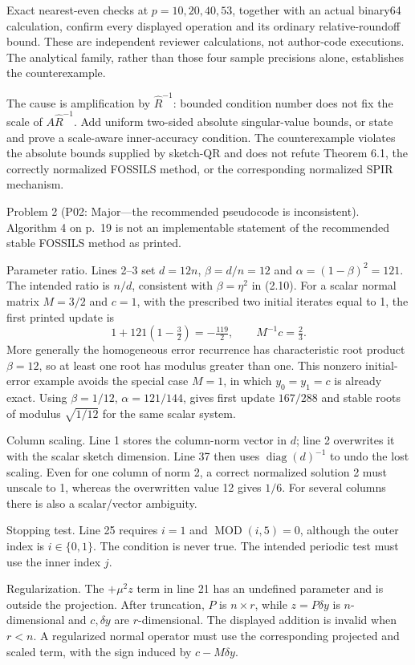 \documentclass[10pt]{article}
\begin{document}
Exact nearest-even checks at \(p=10,20,40,53\), together with an actual binary64 calculation, confirm every displayed operation and its ordinary relative-roundoff bound. These are independent reviewer calculations, not author-code executions. The analytical family, rather than those four sample precisions alone, establishes the counterexample.\par
The cause is amplification by \(\widehat R^{-1}\): bounded condition number does not fix the scale of \(A\widehat R^{-1}\). Add uniform two-sided absolute singular-value bounds, or state and prove a scale-aware inner-accuracy condition. The counterexample violates the absolute bounds supplied by sketch-QR and does not refute Theorem 6.1, the correctly normalized FOSSILS method, or the corresponding normalized SPIR mechanism.\par
Problem 2 (P02: Major—the recommended pseudocode is inconsistent).  Algorithm 4 on p. 19 is not an implementable statement of the recommended stable FOSSILS method as printed.\par
Parameter ratio. Lines 2–3 set \(d=12n\), \(\beta=d/n=12\) and \(\alpha=(1-\beta)^2=121\). The intended ratio is \(n/d\), consistent with \(\beta=\eta^2\) in (2.10). For a scalar normal matrix \(M=3/2\) and \(c=1\), with the prescribed two initial iterates equal to 1, the first printed update is \[1+121(1-\tfrac32)=-\tfrac{119}{2},
 \qquad M^{-1}c=\tfrac23.\] More generally the homogeneous error recurrence has characteristic root product \(\beta=12\), so at least one root has modulus greater than one. This nonzero initial-error example avoids the special case \(M=1\), in which \(y_0=y_1=c\) is already exact. Using \(\beta=1/12\), \(\alpha=121/144\), gives first update \(167/288\) and stable roots of modulus \(\sqrt{1/12}\) for the same scalar system.\par
Column scaling. Line 1 stores the column-norm vector in \(d\); line 2 overwrites it with the scalar sketch dimension. Line 37 then uses \(\operatorname{diag}(d)^{-1}\) to undo the lost scaling. Even for one column of norm 2, a correct normalized solution 2 must unscale to 1, whereas the overwritten value 12 gives \(1/6\). For several columns there is also a scalar/vector ambiguity.\par
Stopping test. Line 25 requires \(i=1\) and \(\operatorname{MOD}(i,5)=0\), although the outer index is \(i\in\{0,1\}\). The condition is never true. The intended periodic test must use the inner index \(j\).\par
Regularization. The \(+\mu^2z\) term in line 21 has an undefined parameter and is outside the projection. After truncation, \(P\) is \(n\times r\), while \(z=P\delta y\) is \(n\)-dimensional and \(c,\delta y\) are \(r\)-dimensional. The displayed addition is invalid when \(r<n\). A regularized normal operator must use the corresponding projected and scaled term, with the sign induced by \(c-M\delta y\).\par
\end{document}
